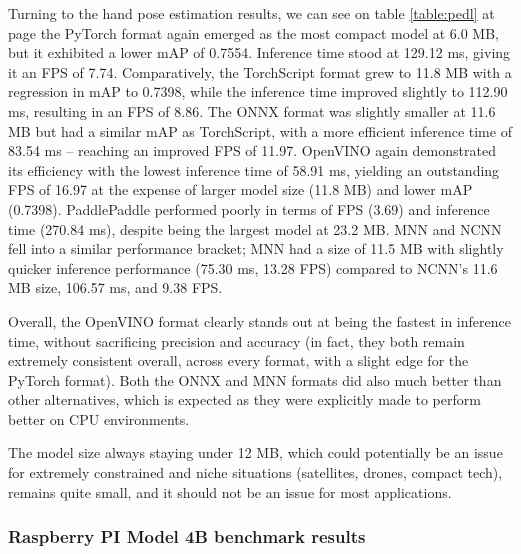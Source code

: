 \documentclass[12pt]{article}
\begin{document}
Turning to the hand pose estimation results, we can see on table \ref{table:pedl} at page \pageref{table:pedl} the PyTorch format again emerged as the most compact model at 6.0 MB, but it exhibited a lower mAP of 0.7554. Inference time stood at 129.12 ms, giving it an FPS of 7.74.
Comparatively, the TorchScript format grew to 11.8 MB with a regression in mAP to 0.7398, while the inference time improved slightly to 112.90 ms, resulting in an FPS of 8.86.
The ONNX format was slightly smaller at 11.6 MB but had a similar mAP as TorchScript, with a more efficient inference time of 83.54 ms – reaching an improved FPS of 11.97.
OpenVINO again demonstrated its efficiency with the lowest inference time of 58.91 ms, yielding an outstanding FPS of 16.97 at the expense of larger model size (11.8 MB) and lower mAP (0.7398).
PaddlePaddle performed poorly in terms of FPS (3.69) and inference time (270.84 ms), despite being the largest model at 23.2 MB.
MNN and NCNN fell into a similar performance bracket; MNN had a size of 11.5 MB with slightly quicker inference performance (75.30 ms, 13.28 FPS) compared to NCNN's 11.6 MB size, 106.57 ms, and 9.38 FPS.

Overall, the OpenVINO format clearly stands out at being the fastest in inference time, without sacrificing precision and accuracy (in fact, they both remain extremely consistent overall, across every format, with a slight edge for the PyTorch format).
Both the ONNX and MNN formats did also much better than other alternatives, which is expected as they were explicitly made to perform better on CPU environments. 

The model size always staying under 12 MB, which could potentially be an issue for extremely constrained and niche situations (satellites, drones, compact tech), remains quite small, and it should not be an issue for most applications.

\subsubsection{Raspberry PI Model 4B benchmark results}
\end{document}
